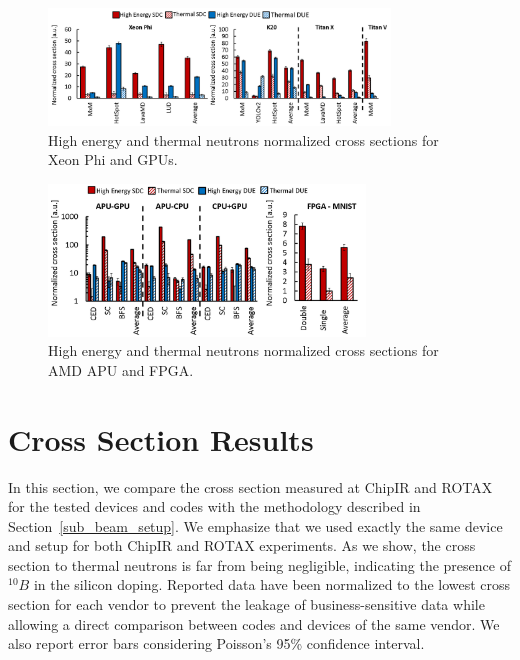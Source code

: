 \begin{figure}[tbh]
	\centering
	\includegraphics[width=0.81\textwidth]{./data/plots_final/cs_xeon_gpus_avg.png}
	\caption{High energy and thermal neutrons normalized cross sections for Xeon Phi and GPUs.}
	\label{cs_xeon_gpus}
\end{figure}

\begin{figure}[th]
	\centering
	\includegraphics[width=0.75\textwidth]{./data/plots_final/cs_APU_FPGA_avg.png}
	\caption{High energy and thermal neutrons normalized cross sections for AMD APU and FPGA.}
	\label{cs_apu_fpga}
\end{figure}

\section{Cross Section Results}
\label{sec_results}

In this section, we compare the cross section measured at ChipIR and ROTAX for the tested devices and codes with the methodology described in Section~\ref{sub_beam_setup}. We emphasize that we used exactly the same device and setup for both ChipIR and ROTAX experiments. %
As we show, the cross section to thermal neutrons is far from being negligible, indicating the presence of $^{10}B$ in the silicon doping. Reported data have been normalized to the lowest cross section for each vendor to prevent the leakage of business-sensitive data while allowing a direct comparison between codes and devices of the same vendor. We also report error bars considering Poisson's 95\% confidence interval.


